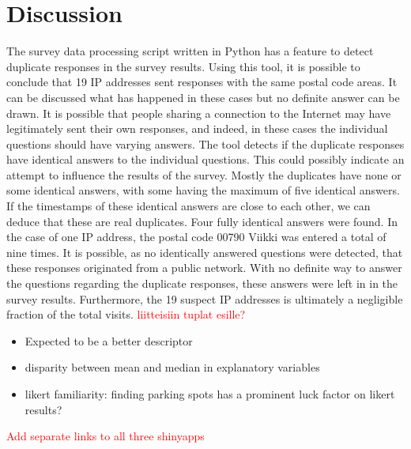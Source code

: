 \section{Discussion}
\justify


The survey data processing script written in Python has a feature to detect duplicate responses in the survey results. Using this tool, it is possible to conclude that 19 IP addresses sent responses with the same postal code areas. It can be discussed what has happened in these cases but no definite answer can be drawn. It is possible that people sharing a connection to the Internet may have legitimately sent their own responses, and indeed, in these cases the individual questions should have varying answers. The tool detects if the duplicate responses have identical answers to the individual questions. This could possibly indicate an attempt to influence the results of the survey. Mostly the duplicates have none or some identical answers, with some having the maximum of five identical answers. If the timestamps of these identical answers are close to each other, we can deduce that these are real duplicates. Four fully identical answers were found. In the case of one IP address, the postal code 00790 Viikki was entered a total of nine times. It is possible, as no identically answered questions were detected, that these responses originated from a public network. With no definite way to answer the questions regarding the duplicate responses, these answers were left in in the survey results. Furthermore, the 19 suspect IP addresses is ultimately a negligible fraction of the total visits. \textcolor{red}{liitteisiin tuplat esille?}

\begin{itemize}
    \item Expected  to be a better descriptor
    \item disparity between mean and median in explanatory variables
    \item likert familiarity: finding parking spots has a prominent luck factor on likert results?
\end{itemize}

\textcolor{red}{Add separate links to all three shinyapps}